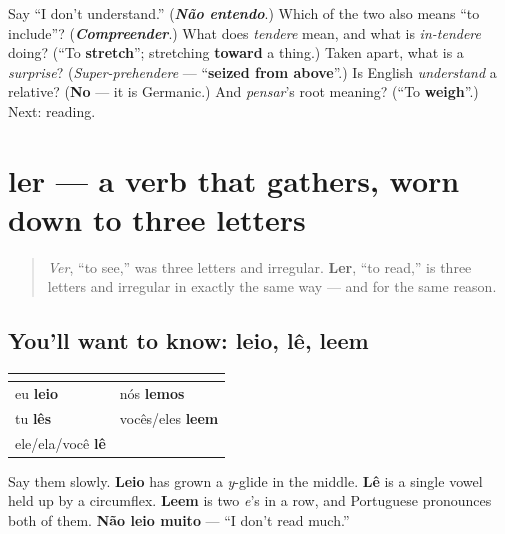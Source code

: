 \begin{tcolorbox}[breakable,colback=teal!4,colframe=teal!35!black,title={Before you move on}]
Say \textquotedblleft{}I don't understand.\textquotedblright{} (\emph{\textbf{Não entendo}}.) Which of the two also means \textquotedblleft{}to include\textquotedblright{}? (\emph{\textbf{Compreender}}.) What does \emph{tendere} mean, and what is \emph{in-tendere} doing? (\textquotedblleft{}To \textbf{stretch}\textquotedblright{}; stretching \textbf{toward} a thing.) Taken apart, what is a \emph{surprise}? (\emph{Super-prehendere} — \textquotedblleft{}\textbf{seized from above}\textquotedblright{}.) Is English \emph{understand} a relative? (\textbf{No} — it is Germanic.) And \emph{pensar}'s root meaning? (\textquotedblleft{}To \textbf{weigh}\textquotedblright{}.) Next: reading.
\end{tcolorbox}
\section[ler]{ler — a verb that gathers, worn down to three letters}

\label{lesson:PT-C19-ler}



\begin{quote}
\emph{Ver}, \textquotedblleft{}to see,\textquotedblright{} was three letters and irregular. \textbf{Ler}, \textquotedblleft{}to read,\textquotedblright{} is three letters and irregular in exactly the same way — and for the same reason.
\end{quote}

\subsection*{You'll want to know: leio, lê, leem}
\noindent
\begin{tabularx}{\linewidth}{@{}>{\raggedright\arraybackslash}X>{\raggedright\arraybackslash}X@{}}
\toprule
\textbf{} & \textbf{} \\
\midrule
eu \textbf{leio} & nós \textbf{lemos} \\
tu \textbf{lês} & vocês/eles \textbf{leem} \\
ele/ela/você \textbf{lê} &  \\
\bottomrule
\end{tabularx}

Say them slowly. \textbf{Leio} has grown a \emph{y}-glide in the middle. \textbf{Lê} is a single vowel held up by a circumflex. \textbf{Leem} is two \emph{e}'s in a row, and Portuguese pronounces both of them. \textbf{Não leio muito} — \textquotedblleft{}I don't read much.\textquotedblright{}

